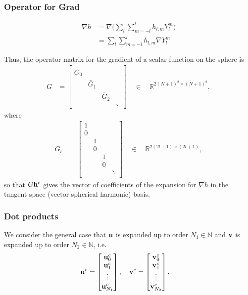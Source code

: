 \documentclass[11pt, oneside]{article}   	%
\newcommand{\R}{\mathbb{R}}
\newcommand{\N}{\mathbb{N}}
\newcommand{\Ylm}{Y^m_l}
\newcommand{\gradYlm}{\nabla Y^m_l}
\begin{document}
\subsubsection{Operator for Grad}
\begin{align}
\nabla h &= \nabla \Big( \sum_l \sum_{m=-l}^{l} h_{l,m} \Ylm \Big) \\
&= \sum_l \sum_{m=-l}^{l} h_{l,m} \gradYlm
\end{align}

Thus, the operator matrix for the gradient of a scalar function on the sphere is
\begin{align}
G &=  \begin{bmatrix}
		\tilde{G_0} & & & \\
		& \tilde{G_1} & & \\
		& & \tilde{G_2} & \\
		& & & \ddots
	  \end{bmatrix}  \quad \in \quad \R^{2(N+1)^2 \times (N+1)^2},
\end{align}
where
\begin{align}
\tilde{G_l} &=  \begin{bmatrix}
		1 & & & \\
		0 & & & \\
		& 1 & & \\
		& 0 & & \\
		& & 1 & \\
		& & 0 & \\
		& & & \ddots \\
	  \end{bmatrix} \quad \in \quad \R^{2(2l+1) \times (2l+1)},
\end{align}
so that \(G\bold{h}^c\) gives the vector of coefficients of the expansion for \(\nabla h\) in the tangent space (vector spherical harmonic) basis.


\subsubsection{Dot products}

We consider the general case that \(\bold{u}\) is expanded up to order \(N_1 \in \N\) and \(\bold{v}\) is expanded up to order \(N_2 \in \N\), i.e. 
\begin{align}
\bold{u}^c &= \begin{bmatrix}
			\bold{u}_0^c \\
			\bold{u}_1^c \\
			\vdots \\
			\bold{u}_{N_1}^c
		    \end{bmatrix},
\quad
\bold{v}^c = \begin{bmatrix}
			\bold{v}_0^c \\
			\bold{v}_1^c \\
			\vdots \\
			\bold{v}_{N_2}^c
		    \end{bmatrix}.
\end{align}
\end{document}
